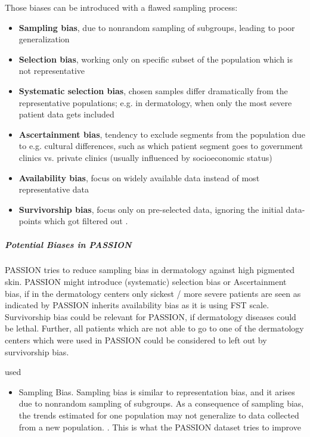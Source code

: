 \begin{refsection}
		Those biases can be introduced with a flawed sampling process:
		\begin{itemize}
			\item \textbf{Sampling bias}, due to nonrandom sampling of subgroups, leading to poor generalization \autocite{Mehrabi_2021}
			\item \textbf{Selection bias}, working only on specific subset of the population which is not representative \autocites{Mester_2022}{Chakraborty_2024}
			\item \textbf{Systematic selection bias}, chosen samples differ dramatically from the representative populations; e.g. in dermatology, when only the most severe patient data gets included \autocite{Chakraborty_2024, c5,c6,c33}
			\item \textbf{Ascertainment bias}, tendency to exclude segments from the population due to e.g. cultural differences, such as which patient segment goes to government clinics vs. private clinics (usually influenced by socioeconomic status) \autocite{Chakraborty_2024, c5}
			\item \textbf{Availability bias}, focus on widely available data instead of most representative data \autocites{Chakraborty_2024, c9, c10}{}
			\item \textbf{Survivorship bias}, focus only on pre-selected data, ignoring the initial data-points which got filtered out \autocite{Mester_2022}.
		\end{itemize}
		
		
		\subparagraph{Potential Biases in PASSION}
		PASSION tries to reduce sampling bias in dermatology against high pigmented skin.
		PASSION might introduce (systematic) selection bias or Ascertainment bias, if in the dermatology centers only sickest / more severe patients are seen as indicated by \textcite{Chakraborty_2024}
		PASSION inherits availability bias as it is using \gls{FST} scale.
		Survivorship bias could be relevant for PASSION, if dermatology diseases could be lethal. Further, all patients which are not able to go to one of the dermatology centers which were used in PASSION could be considered to left out by survivorship bias.
		
		\rawcitationstart
		used
		\begin{itemize}		
			\rawcitationusedstart
			\item Sampling Bias. Sampling bias is similar to representation bias, and it arises due to nonrandom sampling of subgroups. As a consequence of sampling bias, the trends estimated for one population may not generalize to data collected from a new population. \autocite{Mehrabi_2021}. This is what the PASSION dataset tries to improve
			

\end{itemize}
\end{refsection}
